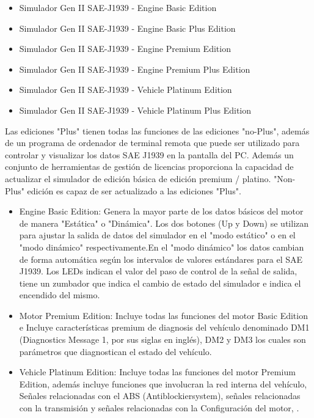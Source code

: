 \begin {itemize}
  
    \item Simulador Gen II  SAE-J1939  - Engine Basic Edition
	\item Simulador Gen II  SAE-J1939  - Engine Basic Plus Edition
	\item Simulador Gen II  SAE-J1939  - Engine Premium Edition
	\item Simulador Gen II  SAE-J1939  - Engine Premium Plus Edition
	\item Simulador Gen II  SAE-J1939  - Vehicle Platinum Edition
	\item Simulador Gen II  SAE-J1939  - Vehicle Platinum Plus Edition

\end{itemize}

Las ediciones "Plus" tienen todas las funciones de las ediciones "no-Plus", además de un programa de ordenador de terminal remota que puede ser utilizado para controlar y visualizar los datos SAE J1939 en la pantalla del PC. Además un conjunto de herramientas de gestión de licencias proporciona la capacidad de actualizar el simulador de edición básica de edición premium / platino. "Non-Plus" edición es capaz de ser actualizado a las ediciones "Plus".

\begin{itemize}
\item Engine Basic Edition: Genera la mayor parte de los datos básicos del motor de manera "Estática" o "Dinámica". Los dos botones (Up y Down) se utilizan para ajustar la salida de datos del simulador en el "modo estático" o en el "modo dinámico" respectivamente.En el "modo dinámico" los datos cambian de forma automática según los intervalos de valores estándares para el SAE  J1939. Los LEDs indican el valor del paso de control de la señal de salida, tiene un zumbador que indica el cambio de estado del simulador e indica el encendido del mismo.
\item Motor Premium Edition:
Incluye todas las funciones del motor Basic Edition e Incluye características premium de diagnosis del vehículo denominado DM1 (Diagnostics Message 1, por sus siglas en inglés),  DM2 y DM3 los cuales son parámetros que diagnostican el estado del vehículo.

\item Vehicle Platinum Edition: Incluye todas las funciones del motor Premium Edition, además incluye funciones que involucran la red interna del vehículo,  Señales relacionadas con el ABS (Antiblockiersystem), señales relacionadas con la transmisión y señales relacionadas con la Configuración del motor, \cite{UserM}.

\end{itemize}

